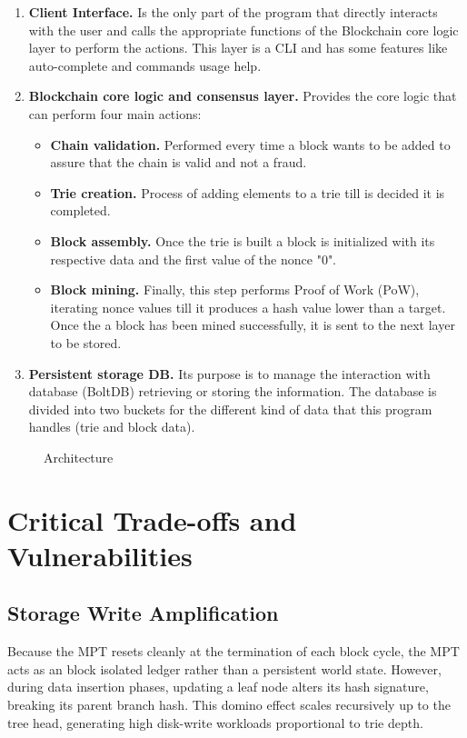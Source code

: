 \documentclass[10pt, conference]{IEEEtran}
\begin{document}
	\begin{enumerate}	
		\item \textbf{Client Interface.} Is the only part of the program that directly interacts with the user and calls the appropriate functions of the Blockchain core logic layer to perform the actions. This layer is a CLI and has some features like auto-complete and commands usage help.
		
		\item \textbf{Blockchain core logic and consensus layer.} Provides the core logic that can perform four main actions:
		
		\begin{itemize}
			\item \textbf{Chain validation.} Performed every time a block wants to be added to assure that the chain is valid and not a fraud.
			\item \textbf{Trie creation.} Process of adding elements to a trie till is decided it is completed.
			\item \textbf{Block assembly.} Once the trie is built a block is initialized with its respective data and the first value of the nonce "0".
			\item \textbf{Block mining.} Finally, this step performs Proof of Work (PoW), iterating nonce values till it produces a hash value lower than a target. Once the a block has been mined successfully, it is sent to the next layer to be stored.
		\end{itemize}
		
		\item \textbf{Persistent storage DB.} Its purpose is to manage the interaction with database (BoltDB) retrieving or storing the information. The database is divided into two buckets for the different kind of data that this program handles (trie and block data).	
	\end{enumerate}	
	
	\begin{figure}[htbp]
		\centering
		
		\caption{Architecture}
		\label{fig:architecture}
	\end{figure}
	
	\section{Critical Trade-offs and Vulnerabilities}
	
	\subsection{Storage Write Amplification}
	Because the MPT resets cleanly at the termination of each block cycle, the MPT acts as an block isolated ledger rather than a persistent world state. However, during data insertion phases, updating a leaf node alters its hash signature, breaking its parent branch hash. This domino effect scales recursively up to the tree head, generating high disk-write workloads proportional to trie depth.
\end{document}
